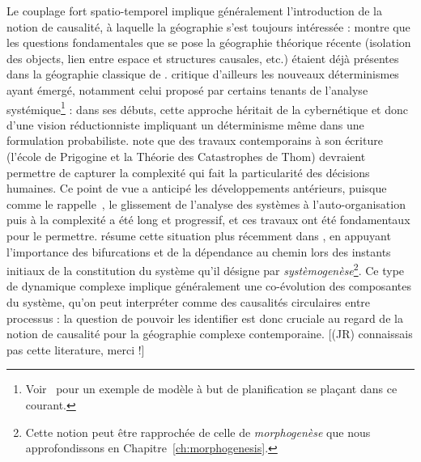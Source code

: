 {Le couplage fort spatio-temporel implique généralement l'introduction de la notion de causalité, à laquelle la géographie s'est toujours intéressée : \cite{loi1985etude} montre que les questions fondamentales que se pose la géographie théorique récente (isolation des objects, lien entre espace et structures causales, etc.) étaient déjà présentes dans la géographie classique de . \cite{claval1985causalite} critique d'ailleurs les nouveaux déterminismes ayant émergé, notamment celui proposé par certains tenants de l'analyse systémique\footnote{Voir~\cite{chamussy1984dynamique} pour un exemple de modèle à but de planification se plaçant dans ce courant.} : dans ses débuts, cette approche héritait de la cybernétique et donc d'une vision réductionniste impliquant un déterminisme même dans une formulation probabiliste.  note que des travaux contemporains à son écriture (l'école de Prigogine et la Théorie des Catastrophes de Thom) devraient permettre de capturer la complexité qui fait la particularité des décisions humaines. Ce point de vue a anticipé les développements antérieurs, puisque comme le rappelle~\cite{pumain2003approche}, le glissement de l'analyse des systèmes à l'auto-organisation puis à la complexité a été long et progressif, et ces travaux ont été fondamentaux pour le permettre.  résume cette situation plus récemment dans \cite{durand2003geographes}, en appuyant l'importance des bifurcations et de la dépendance au chemin lors des instants initiaux de la constitution du système qu'il désigne par \emph{systèmogenèse}\footnote{Cette notion peut être rapprochée de celle de \emph{morphogenèse} que nous approfondissons en Chapitre~\ref{ch:morphogenesis}.}. Ce type de dynamique complexe implique généralement une co-évolution des composantes du système, qu'on peut interpréter comme des causalités circulaires entre processus : la question de pouvoir les identifier est donc cruciale au regard de la notion de causalité pour la géographie complexe contemporaine. [(JR) connaissais pas cette literature, merci !]
}



